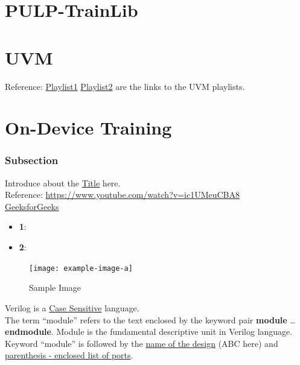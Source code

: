 \documentclass[12pt, a4paper]{article}
\begin{document}
\section{PULP-TrainLib}

\section{UVM}
Reference: \href{https://youtube.com/playlist?list=PLuYB6t6povcLgoHWLJgk-VeMQ0Rscjw03&si=l-rjyvLkuttomYeC}{Playlist1}
\href{https://youtube.com/playlist?list=PLqPfWwayuBvNrr09dCweog1htCBLUbN4W&si=4vI1Fs_sgz-A0wXdC}{Playlist2} are the links to the UVM playlists.

\section{On-Device Training}

\subsubsection{Subsection}

Introduce about the \underline{Title} here. \\

Reference: \url{https://www.youtube.com/watch?v=ic1UMeuCBA8} \\
\href{https://www.geeksforgeeks.org/difference-between-gate-level-and-structural-verilog-hdl/}{GeeksforGeeks}

\begin{itemize}
    \item \textbf{1}: 
    \item \textbf{2}:
\end{itemize}

\begin{figure}[h]   %
    \centering
    \texttt{[image: example-image-a]} %
    \caption{Sample Image}%
    \label{fig:veri1}
\end{figure}

Verilog is a \underline{Case Sensitive} language. \\
The term ``module'' refers to the text enclosed by the keyword pair \textbf{module} \ldots \textbf{endmodule}. Module is the fundamental descriptive unit in Verilog language. \\
Keyword ``module'' is followed by the \underline{name of the design} (ABC here) and \uline{parenthesis - enclosed list of ports}.\\
\end{document}
